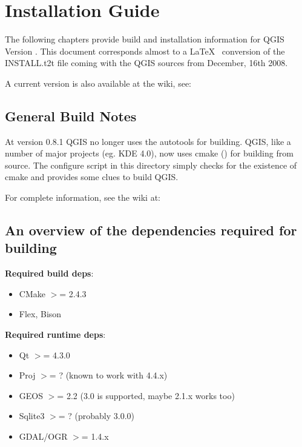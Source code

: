 \section{Installation Guide}\label{label_install}

\updatedisclaimer

The following chapters provide build and installation information for QGIS
Version \CURRENT. This document corresponds almost to a \LaTeX~ conversion of
the INSTALL.t2t file coming with the QGIS sources from December, 16th 2008.

A current version is also available at the wiki, see:

\subsection{General Build Notes}
At version 0.8.1 QGIS no longer uses the autotools for building. QGIS, like a
number of major projects (eg. KDE 4.0), now uses cmake ()
for building from source. The configure script in this directory simply checks
for the existence of cmake and provides some clues to build QGIS.

For complete information, see the wiki at:

\subsection{An overview of the dependencies required for building}

\textbf{Required build deps}:

\begin{itemize}
\item CMake $>$= 2.4.3
\item Flex, Bison
\end{itemize}

\textbf{Required runtime deps}:

\begin{itemize}
\item Qt $>$= 4.3.0
\item Proj $>$= ? (known to work with 4.4.x)
\item GEOS $>$= 2.2 (3.0 is supported, maybe 2.1.x works too)
\item Sqlite3 $>$= ? (probably 3.0.0)
\item GDAL/OGR $>$= 1.4.x
\end{itemize}


